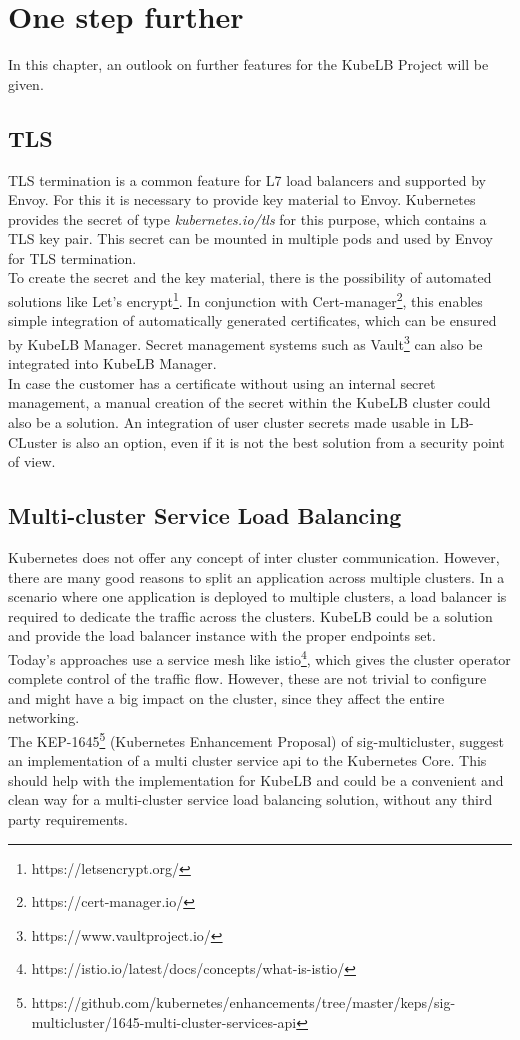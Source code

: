 \chapter{One step further}

In this chapter, an outlook on further features for the KubeLB Project will be given.

\section{TLS}

TLS termination is a common feature for L7 load balancers and supported by Envoy.
For this it is necessary to provide key material to Envoy.
Kubernetes provides the secret of type \textit{kubernetes.io/tls} for this purpose, which contains a TLS key pair.
This secret can be mounted in multiple pods and used by Envoy for TLS termination.
\\
To create the secret and the key material, there is the possibility of automated solutions like Let's encrypt\footnote{https://letsencrypt.org/}.
In conjunction with Cert-manager\footnote{https://cert-manager.io/}, this enables simple integration of automatically generated certificates, which can be ensured by KubeLB Manager.
Secret management systems such as Vault\footnote{https://www.vaultproject.io/} can also be integrated into KubeLB Manager.
\\
In case the customer has a certificate without using an internal secret management, a manual creation of the secret within the KubeLB cluster could also be a solution.
An integration of user cluster secrets made usable in LB-CLuster is also an option, even if it is not the best solution from a security point of view.

\section{Multi-cluster Service Load Balancing}

Kubernetes does not offer any concept of inter cluster communication.
However, there are many good reasons to split an application across multiple clusters.
In a scenario where one application is deployed to multiple clusters, a load balancer is required to dedicate the traffic across the clusters.
KubeLB could be a solution and provide the load balancer instance with the proper endpoints set.
\\
Today's approaches use a service mesh like istio\footnote{https://istio.io/latest/docs/concepts/what-is-istio/}, which gives the cluster operator complete control of the traffic flow.
However, these are not trivial to configure and might have a big impact on the cluster, since they affect the entire networking.
\\
The KEP-1645\footnote{https://github.com/kubernetes/enhancements/tree/master/keps/sig-multicluster/1645-multi-cluster-services-api} (Kubernetes Enhancement Proposal) of sig-multicluster, suggest an implementation of a multi cluster service api to the Kubernetes Core.
This should help with the implementation for KubeLB and could be a convenient and clean way for a multi-cluster service load balancing solution, without any third party requirements.
